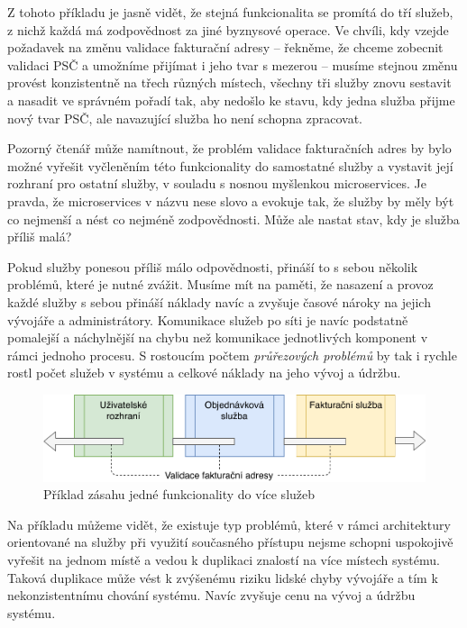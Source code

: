 Z tohoto příkladu je jasně vidět, že stejná funkcionalita se promítá
do tří služeb, z nichž každá má zodpovědnost za jiné byznysové operace. Ve chvíli,
kdy vzejde požadavek na změnu validace fakturační adresy – řekněme, že chceme zobecnit
validaci PSČ a umožníme přijímat i jeho tvar s mezerou – musíme stejnou změnu
provést konzistentně na třech různých místech, všechny tři služby znovu
sestavit a nasadit ve správném pořadí tak, aby nedošlo ke stavu,
kdy jedna služba přijme nový tvar PSČ, ale navazující služba ho není
schopna zpracovat.

Pozorný čtenář může namítnout, že problém validace fakturačních adres by
bylo možné vyřešit vyčleněním této funkcionality
do samostatné služby a vystavit její rozhraní pro ostatní služby,
v souladu s nosnou myšlenkou microservices. Je pravda, že microservices
v názvu nese slovo  a evokuje tak, že služby by měly být co nejmenší
a nést co nejméně zodpovědnosti. Může ale nastat stav, kdy je služba příliš malá?

Pokud služby ponesou příliš málo odpovědnosti,
přináší to s sebou několik problémů, které je nutné zvážit. Musíme mít na paměti, že
nasazení a provoz každé služby s sebou přináší náklady navíc
a zvyšuje časové nároky na jejich vývojáře a administrátory.
Komunikace služeb po síti je navíc podstatně pomalejší a náchylnější na
chybu než komunikace jednotlivých komponent v rámci jednoho procesu.
S rostoucím počtem \textit{průřezových problémů} by tak i rychle rostl
počet služeb v systému a celkové náklady na jeho vývoj a údržbu.

\begin{figure}
    \centering
    \includegraphics[keepaspectratio=true, width=0.8\linewidth]{figures/service-cutting.pdf}
    \caption{Příklad zásahu jedné funkcionality do více služeb}
    \label{fig:service-cutting}
\end{figure}

Na příkladu můžeme vidět, že existuje typ problémů, které v rámci architektury
orientované na služby při využití současného přístupu nejsme schopni uspokojivě
vyřešit na jednom místě a vedou k duplikaci znalostí na více místech systému.
Taková duplikace může vést k zvýšenému riziku lidské chyby vývojáře a tím k
nekonzistentnímu chování systému. Navíc zvyšuje cenu na vývoj a údržbu systému.

